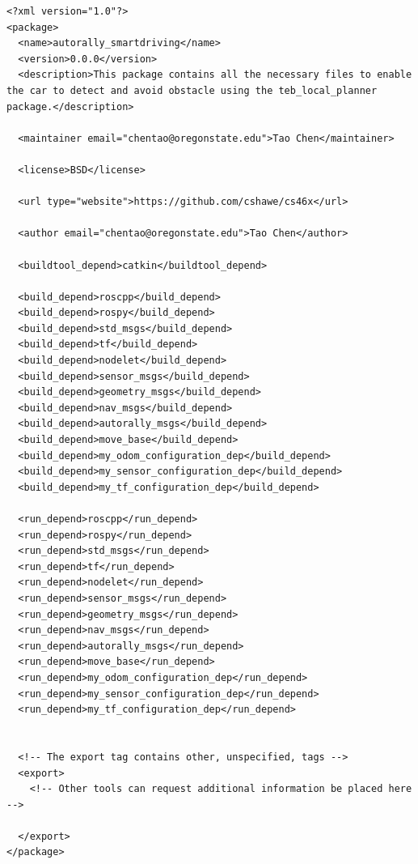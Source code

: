 \documentclass[compsoc,draftclsnofoot,onecolumn,10pt]{IEEEtran}
\begin{document}
\begin{lstlisting}[frame=single,caption={Example package config file}]
<?xml version="1.0"?>
<package>
  <name>autorally_smartdriving</name>
  <version>0.0.0</version>
  <description>This package contains all the necessary files to enable the car to detect and avoid obstacle using the teb_local_planner package.</description>

  <maintainer email="chentao@oregonstate.edu">Tao Chen</maintainer>

  <license>BSD</license>

  <url type="website">https://github.com/cshawe/cs46x</url>

  <author email="chentao@oregonstate.edu">Tao Chen</author>

  <buildtool_depend>catkin</buildtool_depend>

  <build_depend>roscpp</build_depend>
  <build_depend>rospy</build_depend>
  <build_depend>std_msgs</build_depend>
  <build_depend>tf</build_depend>
  <build_depend>nodelet</build_depend>
  <build_depend>sensor_msgs</build_depend>
  <build_depend>geometry_msgs</build_depend>
  <build_depend>nav_msgs</build_depend>
  <build_depend>autorally_msgs</build_depend>
  <build_depend>move_base</build_depend>
  <build_depend>my_odom_configuration_dep</build_depend>
  <build_depend>my_sensor_configuration_dep</build_depend>
  <build_depend>my_tf_configuration_dep</build_depend>

  <run_depend>roscpp</run_depend>
  <run_depend>rospy</run_depend>
  <run_depend>std_msgs</run_depend>
  <run_depend>tf</run_depend>
  <run_depend>nodelet</run_depend>
  <run_depend>sensor_msgs</run_depend>
  <run_depend>geometry_msgs</run_depend>
  <run_depend>nav_msgs</run_depend>
  <run_depend>autorally_msgs</run_depend>
  <run_depend>move_base</run_depend>
  <run_depend>my_odom_configuration_dep</run_depend>
  <run_depend>my_sensor_configuration_dep</run_depend>
  <run_depend>my_tf_configuration_dep</run_depend>


  <!-- The export tag contains other, unspecified, tags -->
  <export>
    <!-- Other tools can request additional information be placed here -->

  </export>
</package>
\end{lstlisting}
\end{document}
